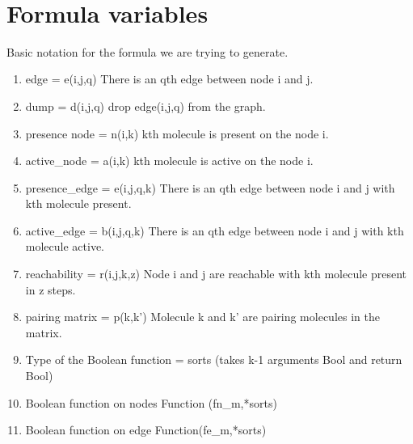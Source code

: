 \documentclass{llncs}
\begin{document}
\vspace*{0.2in}

\begin{flushleft}
{\Large
\textbf{} %
}
\newline
\\
\end{flushleft}



\section{Formula variables}
Basic notation for the formula we are trying to generate.
\begin{enumerate}
\item edge = e(i,j,q)
      There is an qth edge between node i and j.
      
\item dump = d(i,j,q)
       drop edge(i,j,q) from the graph. 
       
\item presence node = n(i,k) 
	  kth molecule is present on the node i.
      
\item active\_node = a(i,k) 
      kth molecule is active on the node i.
      
\item presence\_edge = e(i,j,q,k)
      There is an qth edge between node i and j with kth molecule present.

\item active\_edge = b(i,j,q,k)
      There is an qth edge between node i and j with kth molecule active.

\item reachability = r(i,j,k,z)
      Node i and j are reachable with kth molecule present in z steps.

\item pairing matrix = p(k,k')
      Molecule k and k' are pairing molecules in the matrix.

\item Type of the Boolean function = sorts (takes k-1 arguments Bool and return Bool) 
\item Boolean function on nodes Function (fn\_{m},*sorts) 

\item Boolean function on edge Function(fe\_{m},*sorts)

\end{enumerate}
\end{document}
